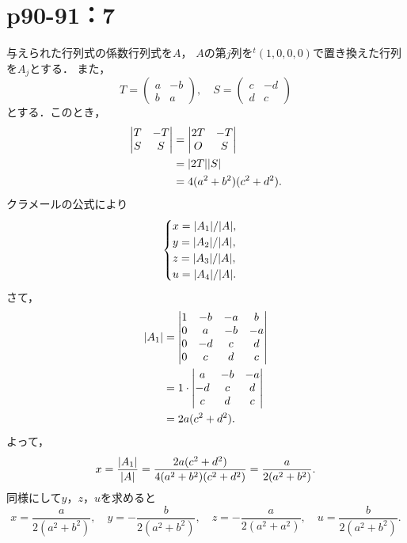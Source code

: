 \documentclass[a4paper,10pt,fleqn]{ltjsarticle}
\begin{document}
\newpage

\section*{p90-91：7}


\begin{tleftbar}
    与えられた行列式の係数行列式を$A$， $A$の第$j$列を${}^t (1, 0, 0 ,0 )$で置き換えた行列を$A_j$とする．
    また，
    \[
        T = \begin{pmatrix} a & -b\\ b & a \end{pmatrix},\quad S = \begin{pmatrix} c & -d\\ d & c \end{pmatrix}
    \]
    とする．このとき，
    \begin{align*}
        \begin{vmatrix} T & -T \\  S & S \end{vmatrix} & = \begin{vmatrix} 2T & - T \\ O & S \end{vmatrix} \\
                                                       & = \abs{2T} \abs{S}                                \\
                                                       & = 4(a^2+b^2) (c^2+d^2).
    \end{align*}
    クラメールの公式により
    \[
        \begin{cases}
            x  = \abs{A_1}/\abs{A}, \\
            y = \abs{A_2}/\abs{A},  \\
            z = \abs{A_3}/\abs{A},  \\
            u = \abs{A_4}/\abs{A}.
        \end{cases}
    \]
    さて，
    \begin{align*}
        \abs{A_1} & = \begin{vmatrix} 1 & -b & -a & b \\ 0 & a & -b & -a \\ 0 & -d & c & d \\ 0 & c & d & c \end{vmatrix} \\
                  & = 1 \cdot \begin{vmatrix} a & -b & -a \\ -d & c & d \\ c & d & c \end{vmatrix}                        \\
                  & = 2a(c^2+d^2).
    \end{align*}
    よって，
    \[
        x = \frac{\abs{A_1}}{\abs{A}} = \frac{2a(c^2+d^2)}{4(a^2+b^2)(c^2+d^2)} = \frac{a}{2(a^2+b^2)}.
    \]
    同様にして$y$，$z$，$u$を求めると
    \[
        x= \frac{a}{2(a^2+b^2)},\quad y = -\frac{b}{2(a^2+b^2)},\quad z = -\frac{a}{2(a^2+a^2)},\quad u = \frac{b}{2(a^2+b^2)}.
    \]
\end{tleftbar}
\end{document}
